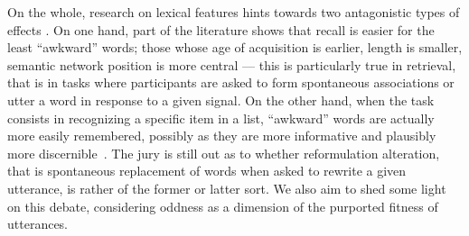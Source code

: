On the whole, research on lexical features hints towards two antagonistic types of effects .
On one hand, part of the literature shows that recall is easier for the least ``awkward'' words;
those whose age of acquisition is earlier, length is smaller, semantic network position is more central --- this is particularly true in retrieval, that is in tasks where participants are asked to form spontaneous associations or utter a word in response to a given signal.
On the other hand, when the task consists in recognizing a specific item in a list, ``awkward'' words are actually more easily remembered, possibly as they are more informative and plausibly more discernible~\citep[see again][for a review]{yonelinas_nature_2002}.
The jury is still out as to whether reformulation alteration, that is spontaneous replacement of words when asked to rewrite a given utterance, is rather of the former or latter sort.
We also aim to shed some light on this debate, considering oddness as a dimension of the purported fitness of utterances.
